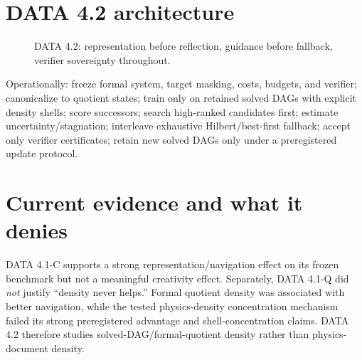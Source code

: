 \documentclass[11pt]{article}
\begin{document}
\section{DATA 4.2 architecture}
\begin{figure}[ht]\centering{}\caption{DATA 4.2: representation before reflection, guidance before fallback, verifier sovereignty throughout.}\end{figure}
Operationally: freeze formal system, target masking, costs, budgets, and verifier; canonicalize to quotient states; train only on retained solved DAGs with explicit density shells; score successors; search high-ranked candidates first; estimate uncertainty/stagnation; interleave exhaustive Hilbert/best-first fallback; accept only verifier certificates; retain new solved DAGs only under a preregistered update protocol.
\section{Current evidence and what it denies}
DATA 4.1-C supports a strong representation/navigation effect on its frozen benchmark but not a meaningful creativity effect. Separately, DATA 4.1-Q did \emph{not} justify ``density never helps.'' Formal quotient density was associated with better navigation, while the tested physics-density concentration mechanism failed its strong preregistered advantage and shell-concentration claims. DATA 4.2 therefore studies solved-DAG/formal-quotient density rather than physics-document density.
\end{document}
